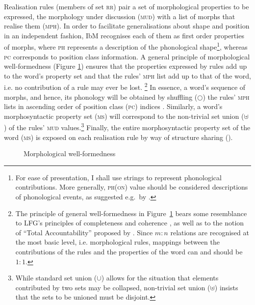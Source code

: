 \documentclass[output=paper]{langsci/langscibook}
\begin{document}
Realisation rules (members of set \textsc{rr}) pair a set of
morphological properties to be expressed, the morphology under
discussion (\textsc{mud}) with a list of morphs that realise them
(\textsc{mph}). In order to facilitate generalisations about shape and
position in an independent fashion, IbM recognises each of them as
first order properties of morphs, where \textsc{ph} represents
a description of the phonological shape\footnote{For ease of
  presentation, I shall use strings to represent phonological
  contributions. More generally, \textsc{ph(on)} value should be
  considered descriptions of phonological events, as suggested e.g.\ by
\citet{Bird:Klein:94}.}, whereas \textsc{pc} corresponds
to position class information.  A general principle of morphological
well-formedness (Figure \ref{fig:MCC}) ensures that the properties
expressed by rules add up to the word's property set and that the
rules' \textsc{mph} list add up to that of the word, i.e. no
contribution of a rule may ever be lost. \footnote{The principle of
  general well-formedness in Figure~\ref{fig:MCC} bears some
  resemblance to LFG's principles of completeness and coherence
  \citep{bresnan_j82}, as well as to the notion of ``Total
  Accountability'' proposed by \citet{Hockett47}. Since $m:n$ relations
  are recognised at the most basic level, i.e. morphological rules,
  mappings between the contributions of the rules and the properties
  of the word can and should be $1:1$. } In essence, a word's sequence
of morphs, and hence, its phonology will be obtained by shuffling
($\bigcirc$) the rules' \textsc{mph} lists in ascending order of
position class (\textsc{pc}) indices \citep[see][for
details]{bonami-crysmann:2013}. Similarly, a word's morphosyntactic
property set (\textsc{ms}) will correspond to the non-trivial set
union ($\uplus$) of the rules' \textsc{mud} values.\footnote{While
  standard set union ($\cup$) allows for the situation that elements
  contributed by two sets may be collapsed, non-trivial set union
  ($\uplus$) insists that the sets to be unioned must be disjoint.}
Finally, the entire morphosyntactic property set of the word (\textsc{ms}) is
exposed on each realisation rule by way of structure sharing
(\avm{\0}).

\begin{figure}
  \caption{Morphological well-formedness\label{fig:MCC}}
\end{figure}
\end{document}
